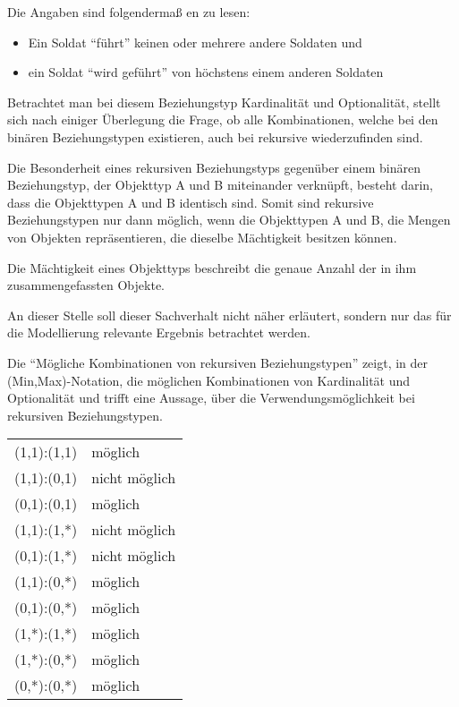         Die Angaben sind folgendermaß en zu lesen:
        \begin{itemize}
          \item Ein Soldat \enquote{führt} keinen oder mehrere andere Soldaten und
          \item ein Soldat \enquote{wird geführt} von höchstens einem anderen Soldaten
        \end{itemize}
        Betrachtet man bei diesem Beziehungstyp Kardinalität und Optionalität, stellt sich nach einiger Überlegung die Frage, ob alle Kombinationen, welche bei den binären Beziehungstypen existieren, auch bei rekursive wiederzufinden sind.

        Die Besonderheit eines rekursiven Beziehungstyps gegenüber einem binären Beziehungstyp, der Objekttyp A und B miteinander verknüpft, besteht darin, dass die Objekttypen A und B identisch sind. Somit sind rekursive Beziehungstypen nur dann möglich, wenn die Objekttypen A und B, die Mengen von Objekten repräsentieren, die dieselbe Mächtigkeit besitzen können.
\clearpage
        \begin{merke}
          Die Mächtigkeit eines Objekttyps beschreibt die genaue Anzahl der in ihm zusammengefassten Objekte.
        \end{merke}
        An dieser Stelle soll dieser Sachverhalt nicht näher erläutert, sondern nur das für die Modellierung relevante Ergebnis betrachtet werden.

        Die  \enquote{Mögliche Kombinationen von rekursiven Beziehungstypen} zeigt, in der\\ (Min,Max)-Notation, die möglichen Kombinationen von Kardinalität und Optionalität und trifft eine Aussage, über die Verwendungsmöglichkeit bei rekursiven Beziehungstypen.

        \label{combinationsrecurisverelationtyps}
        \begin{supertabular}[h]{lp{5cm}}
          (1,1):(1,1) & möglich\\
          (1,1):(0,1) & nicht möglich\\
          (0,1):(0,1) & möglich\\
          (1,1):(1,*) & nicht möglich\\
          (0,1):(1,*) & nicht möglich\\
          (1,1):(0,*) & möglich\\
          (0,1):(0,*) & möglich\\
          (1,*):(1,*) & möglich\\
          (1,*):(0,*) & möglich\\
          (0,*):(0,*) & möglich\\
        \end{supertabular}

